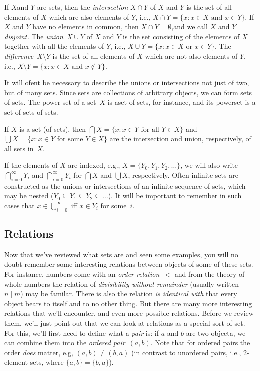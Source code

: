 \documentclass[misc]{subfiles}
\begin{document}
\begin{defn}
If $X$and $Y$ are sets, then the \emph{intersection} $X\cap Y$
of $X$ and $Y$ is the set of all elements of $X$ which are also
elements of $Y$, i.e., $X\cap Y=\{x : x\in X\text{ and }x\in Y\}$.
If $X$ and $Y$ have no elements in common, then $X \cap Y = \emptyset$,and
we call $X$ and $Y$ \emph{disjoint.} The \emph{union}~$X \cup Y$
of $X$ and $Y$ is the set consisting of the elements of $X$ together
with all the elements of $Y$, i.e., $X \cup Y=\{x : x\in X\text{ or }x\in Y\}$.
The \emph{difference}~$X \setminus Y$ is the set of all elements
of $X$ which are not also elements of $Y$, i.e., $X \setminus Y = \{x : x\in X\text{ and }x\notin Y\}$.
\end{defn}

It will ofent be necessary to describe the unions or intersections not just of two, but of many sets.  Since sets are collections of arbitrary objects, we can form sets of sets. The power set of a set~$X$ is aset of sets, for instance, and its powerset is a set of sets of sets.

\begin{defn}
If $X$ is a set (of sets), then $\bigcap X = \{x : x \in Y \text{ for all } Y \in X\}$ and $\bigcup X = \{x : x \in Y \text{ for some } Y \in X\}$ are the intersection and union, respectively, of all sets in~$X$.
\end{defn}

If the elements of $X$ are indexed, e.g., $X = \{Y_0, Y_1, Y_2, \dots\}$, we will also write $\bigcap_{i=0}^\infty Y_i$ and $\bigcap_{i=0}^\infty Y_i$ for $\bigcap X$ and $\bigcup X$, respectively.  Often infinite sets are constructed as the unions or intersections of an infinite sequence of sets, which may be nested ($Y_0 \subseteq Y_1 \subseteq Y_2 \subseteq \dots$).  It will be important to remember in such cases that $x \in \bigcup_{i=0}^\infty$ iff $x \in Y_i$ for some~$i$.

\subsection{Relations}

Now that we've reviewed what sets are and seen some examples, you
will no doubt remember some interesting relations between objects
of some of these sets. For instance, numbers come with an \emph{order
relation}~$<$ and from the theory of whole numbers the relation
of \emph{divisibility without remainder} (usually written $n \mid m$)
may be familar. There is also the relation \emph{is identical with}
that every object bears to itself and to no other thing. But there
are many more interesting relations that we'll encounter, and even
more possible relations. Before we review them, we'll just point out
that we can look at relations as a special sort of set. For this,
we'll first need to define what a \emph{pair} is: if $a$ and $b$
are two objecta, we can combine them into the \emph{ordered pair}~$(a,b)$.
Note that for ordered pairs the order \emph{does} matter, e.g, $(a,b)\neq(b,a)$
(in contrast to unordered pairs, i.e., 2-element sets, where $\{a,b\}=\{b,a\}$).
\end{document}
